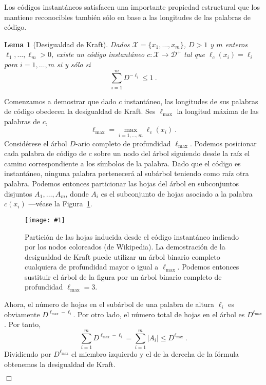 \documentclass[11pt]{article}
\newtheorem{lemma}[theorem]{Lema}
\newenvironment{proof}{{\textsc{Demostración.}\ }}{\hfill$\Box$\\[2mm]}
\newcommand{\figscale}[2]{\texttt{[image: \#1]}}
\newcommand{\scD}{\mathcal{D}}
\newcommand{\scX}{\mathcal{X}}
\newcommand{\lmax}{\ell_{\textrm{max}}}
\begin{document}
Los códigos instantáneos satisfacen una importante propiedad estructural que los mantiene reconocibles también sólo en base a las longitudes de las palabras de código.
%
\begin{lemma}[Desigualdad de Kraft]
Dados $\scX = \{x_1,\dots,x_m\}$, $D > 1$ y $m$ enteros $\ell_1,\dots,\ell_m > 0$, existe un código instantáneo $c : \scX \to \scD^+$ tal que $\ell_c(x_i) = \ell_i$ para $i=1,\dots,m$ si y sólo si
\[
    \sum_{i=1}^m D^{-\ell_i} \le 1~.
\]
\end{lemma}
%
\begin{proof}
Comenzamos a demostrar que dado $c$ instantáneo, las longitudes de sus palabras de código obedecen la desigualdad de Kraft. Ses $\lmax$ la longitud máxima de las palabras de $c$,
\[
    \lmax = \max_{i=1,\dots,m} \ell_c(x_i)~.
\]
Considérese el árbol $D$-ario completo de profundidad $\lmax$. Podemos posicionar cada palabra de código de $c$ sobre un nodo del árbol siguiendo desde la raíz el camino correspondiente a los símbolos de la palabra. Dado que el código es instantáneo, ninguna palabra pertenecerá al subárbol teniendo como raíz otra palabra. Podemos entonces particionar las hojas del árbol en subconjuntos disjuntos $A_1,\dots,A_m$, donde $A_i$ es el subconjunto de hojas asociado a la palabra $c(x_i)$ ---véase la Figura~\ref{fig:kraft}.
%
\begin{figure}[h]
\begin{center}
\figscale{Images/kraft}{0.4}
\end{center}
\caption{
\label{fig:kraft}
Partición de las hojas inducida desde el código instantáneo indicado por los nodos coloreados (de Wikipedia). La demostración de la desigualdad de Kraft puede utilizar un árbol binario completo cualquiera de profundidad mayor o igual a $\lmax$. Podemos entonces sustituir el árbol de la figura por un árbol binario completo de profundidad $\lmax = 3$.
}
\end{figure}

Ahora, el número de hojas en el subárbol de una palabra de altura $\ell_i$ es obviamente $D^{\lmax-\ell_i}$. Por otro lado, el número total de hojas en el árbol es $D^{\lmax}$. Por tanto,
\[
    \sum_{i=1}^m D^{\lmax-\ell_i} = \sum_{i=1}^m |A_i| \le D^{\lmax}~.
\]
Dividiendo por $D^{\lmax}$ el miembro izquierdo y el de la derecha de la fórmula obtenemos la desigualdad de Kraft.


\end{proof}
\end{document}
